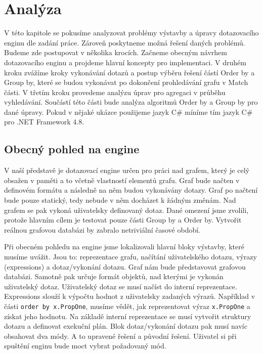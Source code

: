 

\chapter{Analýza}

V této kapitole se pokusíme analyzovat problémy výstavby a úpravy dotazovacího enginu dle zadání práce.
Zároveň poskytneme možná řešení daných problémů.
Budeme zde postupovat v několika krocích. 
Začneme obecným návrhem dotazovacího enginu a projdeme hlavní koncepty pro implementaci.
V druhém kroku zvážíme kroky vykonávání dotazů a postup výběru řešení částí Order by a Group by, které se budou vykonávat po dokončení prohledávání grafu v Match části.
V třetím kroku provedeme analýzu úprav pro agregaci v průběhu vyhledávání. 
Součástí této části bude analýza algoritmů Order by a Group by pro dané úpravy. 
Pokud v nějaké ukázce použijeme jazyk C\# míníme tím jazyk C\# pro .NET Framework 4.8.

\section{Obecný pohled na engine}

V naší představě je dotazovací engine určen pro práci nad grafem, který je celý obsažen v paměti a to včetně vlastností elementů grafu.
Graf bude načten v definovém formátu a následně na něm budou vykonávány dotazy.
Graf po načtení bude pouze statický, tedy nebude v něm docházet k žádným změnám.
Nad grafem se pak vykoná uživatelsky definovaný dotaz.
Dané omezení jsme zvolili, protože hlavním cílem je testovat pouze části Group by a Order by.
Vytvořit reálnou grafovou databázi by zabralo netriviální časové období.

Při obecném pohledu na engine jsme lokalizovali hlavní bloky výstavby, které musíme uvážit.
Jsou to: reprezentace grafu, načítání uživatelského dotazu, výrazy (expressions) a dotaz/vykonání dotazu.
Graf nám bude představovat grafovou databázi. 
Samotně pak určuje formát objektů, nad kterými je vykonán uživatelský dotaz.
Uživatelský dotaz se musí načíst do interní reprezentace.
Expressions slouží k výpočtu hodnot z uživatelsky zadaných výrazů.
Například v části \texttt{order by x.PropOne}, musíme vědět, jak reprezentovat výraz \texttt{x.PropOne} a získat jeho hodnotu. 
Na základě interní reprezentace se musí vytvořit struktury dotazu a definovat exekuční plán. 
Blok dotaz/vykonání dotazu pak musí navíc obsahovat dva módy.
A to upravené řešení a původní řešení.
Uživatel si při spuštění enginu bude moct vybrat požadovaný mód.

